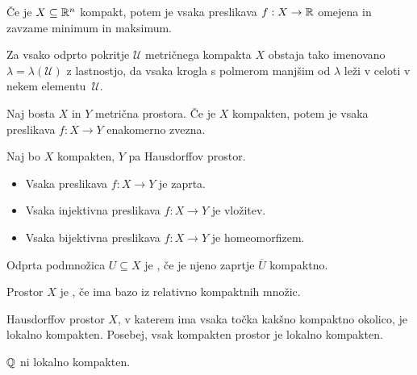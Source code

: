 \begin{posledica}
    Če je $X \subseteq \mathbb{R}^n$ kompakt, potem je vsaka preslikava $f: X \to \mathbb{R}$ omejena in zavzame minimum in maksimum.
\end{posledica}

\begin{izrek}
    Za vsako odprto pokritje \(\mathcal{U}\) metričnega kompakta $X$ obstaja tako imenovano  $\lambda = \lambda (\mathcal{U})$ z lastnostjo, da vsaka krogla s polmerom manjšim od $\lambda$ leži v celoti v nekem elementu~$\mathcal{U}$.
\end{izrek}

\begin{izrek}
    Naj bosta $X$ in $Y$ metrična prostora. Če je $X$ kompakten, potem je vsaka preslikava $f: X \to Y$ enakomerno zvezna.
\end{izrek}

\begin{izrek}
    Naj bo $X$ kompakten, $Y$ pa Hausdorffov prostor.
    \begin{itemize}
        \item Vsaka preslikava $f: X \to Y$ je zaprta.
        \item Vsaka injektivna preslikava \(f:  X \to Y\) je vložitev.
        \item Vsaka bijektivna preslikava \(f:  X \to Y\) je homeomorfizem.
    \end{itemize}
\end{izrek}

\begin{definicija}
    Odprta podmnožica $U \subseteq X$ je , če je njeno zaprtje \(\overline{U}\) kompaktno.
\end{definicija}

\begin{definicija}
    Prostor $X$ je , če ima bazo iz relativno kompaktnih množic.
\end{definicija}

\begin{izrek}
    Hausdorffov prostor $X$, v katerem ima vsaka točka kakšno kompaktno okolico, je lokalno kompakten. Posebej, vsak kompakten prostor je lokalno kompakten.
\end{izrek}

\begin{primer}
    \(\mathbb{Q}\) ni lokalno kompakten.
\end{primer}

